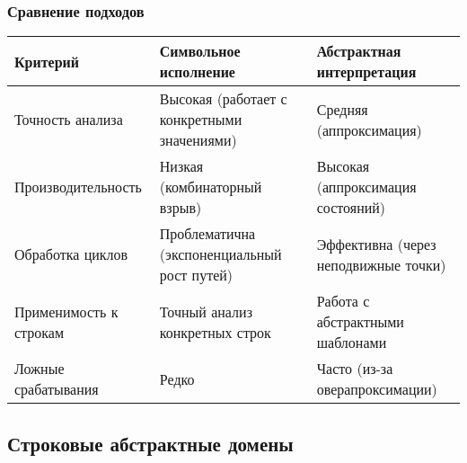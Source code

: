 \subsubsection{Сравнение подходов}
\begin{center}
\begin{tabular}{|p{}|p{}|p{}|}
\hline
\textbf{Критерий} & \textbf{Символьное исполнение} & \textbf{Абстрактная интерпретация} \\
\hline
Точность анализа & Высокая (работает с конкретными значениями) & Средняя (аппроксимация) \\
\hline
Производительность & Низкая (комбинаторный взрыв) & Высокая (аппроксимация состояний) \\
\hline
Обработка циклов & Проблематична (экспоненциальный рост путей) & Эффективна (через неподвижные точки) \\
\hline
Применимость к строкам & Точный анализ конкретных строк & Работа с абстрактными шаблонами \\
\hline
Ложные срабатывания & Редко & Часто (из-за оверапроксимации) \\
\hline
\end{tabular}
\end{center}

\newpage



\subsection{Строковые абстрактные домены}
